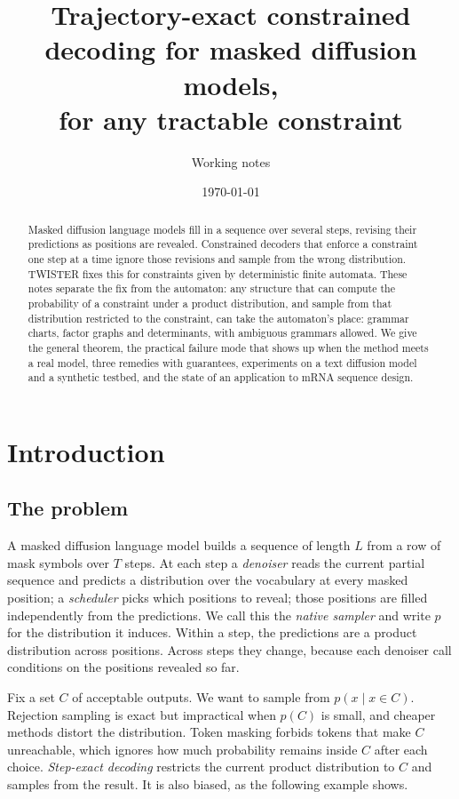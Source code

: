 \documentclass[11pt]{article}
\title{Trajectory-exact constrained decoding for masked diffusion models,\\for any tractable constraint}
\author{Working notes}
\date{\today}
\theoremstyle{definition}
\begin{document}
\maketitle

\begin{abstract}
Masked diffusion language models fill in a sequence over several steps, revising their predictions as positions
are revealed. Constrained decoders that enforce a constraint one step at a time ignore those revisions and sample
from the wrong distribution. TWISTER fixes this for constraints given by deterministic finite automata. These
notes separate the fix from the automaton: any structure that can compute the probability of a constraint under a
product distribution, and sample from that distribution restricted to the constraint, can take the automaton's
place: grammar charts, factor graphs and determinants, with ambiguous grammars
allowed. We give the
general theorem, the practical failure mode that shows up when the method meets a real model, three remedies with
guarantees, experiments on a text diffusion model and a synthetic testbed, and the state of an application to
mRNA sequence design.
\end{abstract}

\tableofcontents

\section{Introduction}\label{sec:intro}

\subsection{The problem}
A masked diffusion language model \cite{sahoo2024} builds a sequence of length $L$ from a row of mask symbols over
$T$ steps. At each step a \emph{denoiser} reads the current partial sequence and predicts a distribution over the
vocabulary at every masked position; a \emph{scheduler} picks which positions to reveal; those positions are
filled independently from the predictions. We call this the \emph{native sampler} and write $p$ for the
distribution it induces. Within a step, the predictions are a product distribution across positions. Across
steps they change, because each denoiser call conditions on the positions revealed so far.

Fix a set $C$ of acceptable outputs. We want to sample from $p(x\mid x\in C)$. Rejection sampling is exact but
impractical when $p(C)$ is small, and cheaper methods distort the distribution. Token masking forbids tokens that
make $C$ unreachable, which ignores how much probability remains inside $C$ after each choice. \emph{Step-exact
decoding} \cite{de26} restricts the current product distribution to $C$ and samples from the result. It is also
biased, as the following example shows.
\end{document}
